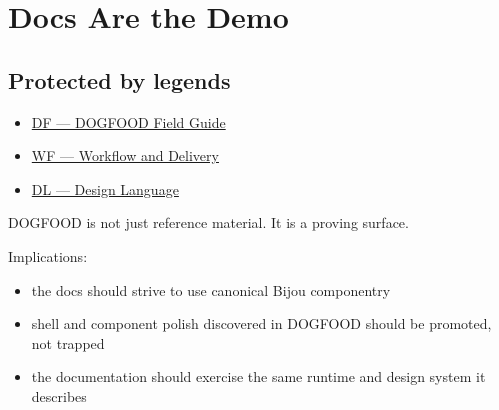 \chapter{Docs Are the Demo}\label{record-041}

\smallskip

\section{Protected by legends}\label{record-041-protected-by-legends}

\begin{itemize}
\tightlist
\item
  \href{https://github.com/flyingrobots/bijou/blob/1853ad902f6bf219326409e7f743a5a1d6517dbc/docs/legends/DF-dogfood-field-guide.md}{DF --- DOGFOOD Field Guide}
\item
  \href{https://github.com/flyingrobots/bijou/blob/1853ad902f6bf219326409e7f743a5a1d6517dbc/docs/legends/WF-workflow-and-delivery.md}{WF --- Workflow and Delivery}
\item
  \href{https://github.com/flyingrobots/bijou/blob/1853ad902f6bf219326409e7f743a5a1d6517dbc/docs/legends/DL-design-language.md}{DL --- Design Language}
\end{itemize}

DOGFOOD is not just reference material. It is a proving surface.

Implications:

\begin{itemize}
\tightlist
\item
  the docs should strive to use canonical Bijou componentry
\item
  shell and component polish discovered in DOGFOOD should be promoted, not trapped
\item
  the documentation should exercise the same runtime and design system it describes
\end{itemize}

